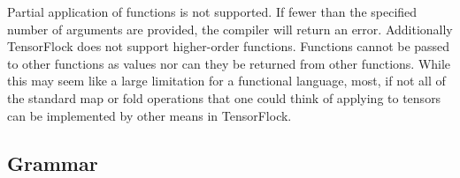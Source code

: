 Partial application of functions is not supported. If fewer than the specified number of 
arguments are provided, the compiler will return an error. Additionally TensorFlock 
does not support higher-order functions. Functions cannot be passed to
other functions as values nor can they be returned from other functions. While
this may seem like a large limitation for a functional language, most, if not
all of the standard map or fold operations that one could think of applying to
tensors can be implemented by other means in TensorFlock.
\subsection{Grammar}
